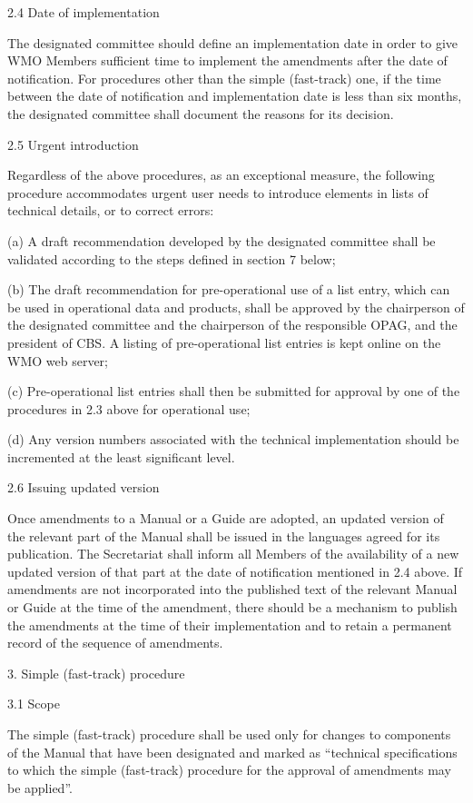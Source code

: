 2.4 Date of implementation

The designated committee should define an implementation date in order to give WMO Members sufficient time to implement the amendments after the date of notification. For procedures other than the simple (fast-track) one, if the time between the date of notification and implementation date is less than six months, the designated committee shall document the reasons for its decision.

2.5 Urgent introduction

Regardless of the above procedures, as an exceptional measure, the following procedure accommodates urgent user needs to introduce elements in lists of technical details, or to correct errors:

(a) A draft recommendation developed by the designated committee shall be validated according to the steps defined in section 7 below;

(b) The draft recommendation for pre-operational use of a list entry, which can be used in operational data and products, shall be approved by the chairperson of the designated committee and the chairperson of the responsible OPAG, and the president of CBS. A listing of pre-operational list entries is kept online on the WMO web server;

(c) Pre-operational list entries shall then be submitted for approval by one of the procedures in 2.3 above for operational use;

(d) Any version numbers associated with the technical implementation should be incremented at the least significant level.

2.6 Issuing updated version

Once amendments to a Manual or a Guide are adopted, an updated version of the relevant part of the Manual shall be issued in the languages agreed for its publication. The Secretariat shall inform all Members of the availability of a new updated version of that part at the date of notification mentioned in 2.4 above. If amendments are not incorporated into the published text of the relevant Manual or Guide at the time of the amendment, there should be a mechanism to publish the amendments at the time of their implementation and to retain a permanent record of the sequence of amendments.

3. Simple (fast-track) procedure

3.1 Scope

The simple (fast-track) procedure shall be used only for changes to components of the Manual that have been designated and marked as ``technical specifications to which the simple (fast-track) procedure for the approval of amendments may be applied''.

